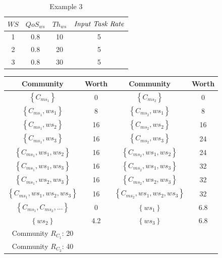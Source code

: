 \documentclass[10pt,journal,cspaper,compsoc]{IEEEtran}
\begin{document}
\begin{table}[!t]
\renewcommand{\arraystretch}{1.3}
\caption{Example 3}
\label{example_3}
\centering
\begin{tabular}{c c c c}
\hline
$WS$ & $QoS_{ws}$ & $Th_{ws}$ & $\text{\emph{Input Task Rate}}$\\
\hline
1 & 0.8 & 10 & 5\\
2 & 0.8 & 20 & 5\\
3 & 0.8 & 30 & 5\\
\hline
\end{tabular}
\end{table}

\begin{table}[!t]
\renewcommand{\arraystretch}{1.3}
\label{example_3_2}
\centering
\begin{tabular}{c c || c c}
\hline
Community & Worth & Community & Worth\\
\hline
$\left\{C_{ms_1}\right\}$ & 0 & $\left\{C_{ms_2}\right\}$ & 0\\
$\left\{C_{ms_1}, ws_1\right\}$ & 8 & $\left\{C_{ms_2}, ws_1\right\}$ & 8\\
$\left\{C_{ms_1}, ws_2\right\}$ & 16 & $\left\{C_{ms_2}, ws_2\right\}$ & 16\\
$\left\{C_{ms_1}, ws_3\right\}$ & 16 & $\left\{C_{ms_2}, ws_3\right\}$ & 24\\
$\left\{C_{ms_1}, ws_1, ws_2\right\}$ & 16 & $\left\{C_{ms_2}, ws_1, ws_2\right\}$ & 24\\
$\left\{C_{ms_1}, ws_1, ws_3\right\}$ & 16 & $\left\{C_{ms_2}, ws_1, ws_3\right\}$ & 32\\
$\left\{C_{ms_1}, ws_2, ws_3\right\}$ & 16 & $\left\{C_{ms_2}, ws_2, ws_3\right\}$ & 32\\
$\left\{C_{ms_1}, ws_1, ws_2, ws_3\right\}$ & 16 & $\left\{C_{ms_2}, ws_1, ws_2, ws_3\right\}$ & 32\\
$\left\{C_{ms_1}, C_{ms_2}, ...\right\}$ & 0 & $\left\{ws_1\right\}$ & 6.8\\
$\left\{ws_2\right\}$ & 4.2 & $\left\{ws_3\right\}$ & 6.8\\
\hline
Community $R_{C_1}$: 20 \\ Community $R_{C_2}$: 40\\
\hline
\end{tabular}
\end{table}
\end{document}
